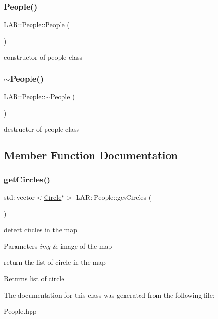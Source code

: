 \subsubsection{\texorpdfstring{People()}{People()}}
{\footnotesize\ttfamily L\+A\+R\+::\+People\+::\+People (\begin{DoxyParamCaption}{ }\end{DoxyParamCaption})}

constructor of people class \mbox{\label{class_l_a_r_1_1_people_a8a5dde9291e7d0aa0419971ed5b421e3}} 
\subsubsection{\texorpdfstring{$\sim$\+People()}{~People()}}
{\footnotesize\ttfamily L\+A\+R\+::\+People\+::$\sim$\+People (\begin{DoxyParamCaption}{ }\end{DoxyParamCaption})}

destructor of people class 

\subsection{Member Function Documentation}
\mbox{\label{class_l_a_r_1_1_people_a7b1aca80884524498197a57dc704e516}} 
\subsubsection{\texorpdfstring{get\+Circles()}{getCircles()}}
{\footnotesize\ttfamily std\+::vector$<$\mbox{\hyperlink{class_geometry2_d_1_1_circle}{Circle}}$\ast$$>$ L\+A\+R\+::\+People\+::get\+Circles (\begin{DoxyParamCaption}{ }\end{DoxyParamCaption})}

detect circles in the map 
\begin{DoxyParams}{Parameters}
{\em img} & image of the map\\
\hline
\end{DoxyParams}
return the list of circle in the map \begin{DoxyReturn}{Returns}
list of circle 
\end{DoxyReturn}


The documentation for this class was generated from the following file\+:\begin{DoxyCompactItemize}
\item 
People.\+hpp\end{DoxyCompactItemize}
